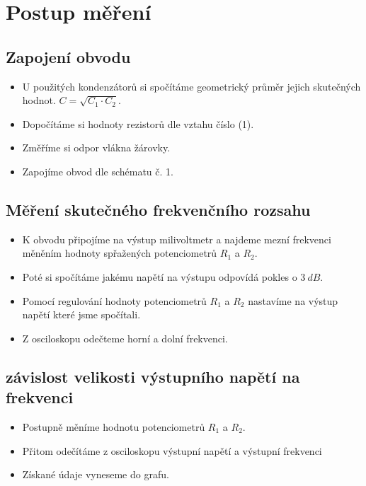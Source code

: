 \section*{Postup měření}
  \subsection*{Zapojení obvodu}
    \begin{itemize}
      \item
      	U použitých kondenzátorů si spočítáme geometrický průměr jejich skutečných hodnot. $C = \sqrt{C_1 \cdot C_2}$.
      \item
      	Dopočítáme si hodnoty rezistorů dle vztahu číslo (1).
      \item
        Změříme si odpor vlákna žárovky.      
      \item
      	Zapojíme obvod dle schématu č. 1.      	
	\end{itemize}
		
  \subsection*{Měření skutečného frekvenčního rozsahu}
    \begin{itemize}
      \item
        K obvodu připojíme na výstup milivoltmetr a najdeme mezní frekvenci měněním hodnoty spřažených potenciometrů $R_1$ a $R_2$.
	  \item
	  	Poté si spočítáme jakému napětí na výstupu odpovídá pokles o $3~dB$.
      \item
      	Pomocí regulování hodnoty potenciometrů $R_1$ a $R_2$ nastavíme na výstup napětí které jsme spočítali.
      \item
      	Z osciloskopu odečteme horní a dolní frekvenci.
	\end{itemize}

  \subsection*{závislost velikosti výstupního napětí na frekvenci}
    \begin{itemize}
      \item
        Postupně měníme hodnotu potenciometrů $R_1$ a $R_2$.
      \item
        Přitom odečítáme z osciloskopu výstupní napětí a výstupní frekvenci
      \item
        Získané údaje vyneseme do grafu.
    \end{itemize}
		
 
